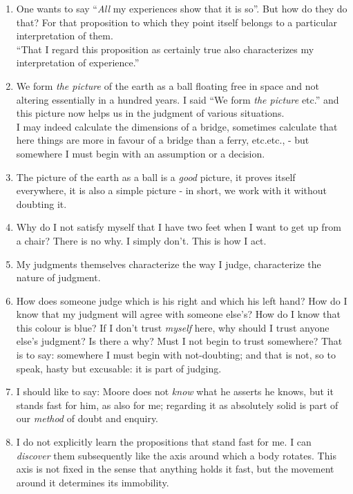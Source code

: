 \documentclass{book}
\begin{document}
\begin{enumerate}
\item
One wants to say ``\emph{All} my experiences show that it is so''. But how do
they do that? For that proposition to which they point itself belongs to a
particular interpretation of them. \\
``That I regard this proposition as certainly true also characterizes my
interpretation of experience.''

\item
We form \emph{the picture} of the earth as a ball floating free in space and
not altering essentially in a hundred years. I said ``We form \emph{the
picture} etc.'' and this picture now helps us in the judgment of various
situations. \\
I may indeed calculate the dimensions of a bridge, sometimes calculate that
here things are more in favour of a bridge than a ferry, etc.etc., - but
somewhere I must begin with an assumption or a decision.

\item
The picture of the earth as a ball is a \emph{good} picture, it proves itself
everywhere, it is also a simple picture - in short, we work with it without
doubting it.

\item
Why do I not satisfy myself that I have two feet when I want to get up from a
chair? There is no why. I simply don't. This is how I act.

\item
My judgments themselves characterize the way I judge, characterize the nature
of judgment.

\item
How does someone judge which is his right and which his left hand? How do I
know that my judgment will agree with someone else's? How do I know that this
colour is blue? If I don't trust \emph{myself} here, why should I trust anyone
else's judgment? Is there a why? Must I not begin to trust somewhere? That is
to say: somewhere I must begin with not-doubting; and that is not, so to speak,
hasty but excusable: it is part of judging.

\item
I should like to say: Moore does not \emph{know} what he asserts he knows, but
it stands fast for him, as also for me; regarding it as absolutely solid is
part of our \emph{method} of doubt and enquiry.

\item
I do not explicitly learn the propositions that stand fast for me. I can
\emph{discover} them subsequently like the axis around which a body rotates.
This axis is not fixed in the sense that anything holds it fast, but the
movement around it determines its immobility.


\end{enumerate}
\end{document}
